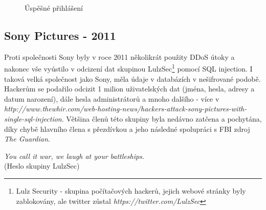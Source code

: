 \begin{figure}[h!]
\caption{Úspěšné přihlášení}
\label{obr.login2}
\end{figure}


\subsection{Sony Pictures - 2011}
Proti společnosti Sony byly v roce 2011 několikrát použity DDoS útoky a nakonec vše vyústilo v odcizení dat skupinou LulzSec\footnote{Lulz Security - skupina počítačových hackerů, jejich webové stránky byly zablokovány, ale twitter zůstal \textit{https://twitter.com/LulzSec}} pomocí SQL injection. I taková velká společnost jako Sony, měla údaje v databázích v nešifrované podobě. Hackerům se podařilo odcizit 1 milion uživatelských dat (jména, hesla, adresy a datum narození), dále hesla administrátorů a mnoho dalšího - více v \textit{http://www.thewhir.com/web-hosting-news/hackers-attack-sony-pictures-with-single-sql-injection}. Většina členů této skupiny byla nedávno zatčena a pochytána, díky chybě hlavního člena s přezdívkou  a jeho následné spolupráci s FBI zdroj \textit{The Guardian}\cite{guardian}.

\begin{center}
\textit{You call it war, we laugh at your battleships.}\\
(Heslo skupiny LulzSec)
\end{center}
